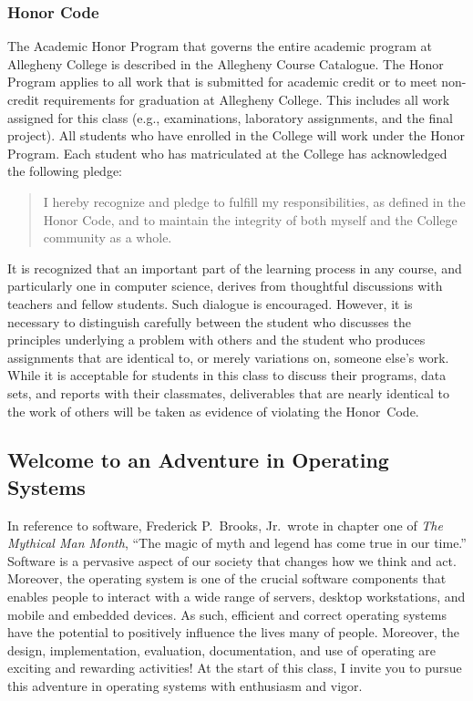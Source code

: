 \subsubsection*{Honor Code}

The Academic Honor Program that governs the entire academic program at Allegheny College is described in the Allegheny
Course Catalogue.  The Honor Program applies to all work that is submitted for academic credit or to meet non-credit
requirements for graduation at Allegheny College.  This includes all work assigned for this class (e.g., examinations,
laboratory assignments, and the final project).  All students who have enrolled in the College will work under the Honor
Program.  Each student who has matriculated at the College has acknowledged the following pledge:

\vspace*{-.1in}
\begin{quote}
I hereby recognize and pledge to fulfill my responsibilities, as defined in the Honor Code, and to maintain the
integrity of both myself and the College community as a whole.
\end{quote}
\vspace*{-.15in}

\noindent It is recognized that an important part of the learning process in any course, and particularly one in
computer science, derives from thoughtful discussions with teachers and fellow students.  Such dialogue is encouraged.
However, it is necessary to distinguish carefully between the student who discusses the principles underlying a problem
with others and the student who produces assignments that are identical to, or merely variations on, someone else's
work.  While it is acceptable for students in this class to discuss their programs, data sets, and reports with their
classmates, deliverables that are nearly identical to the work of others will be taken as evidence of violating the
\mbox{Honor Code}.

\subsection*{Welcome to an Adventure in Operating Systems}

In reference to software, Frederick P.\ Brooks, Jr.\ wrote in chapter one of {\em The Mythical Man Month}, ``The magic
of myth and legend has come true in our time.'' Software is a pervasive aspect of our society that changes how we think
and act. Moreover, the operating system is one of the crucial software components that enables people to interact with a
wide range of servers, desktop workstations, and mobile and embedded devices.  As such, efficient and correct operating
systems have the potential to positively influence the lives many of people.  Moreover, the design, implementation,
evaluation, documentation, and use of operating are exciting and rewarding activities!  At the start of this class, I
invite you to pursue this adventure in operating systems with enthusiasm and vigor.


